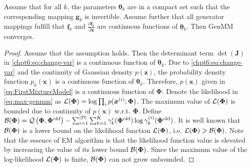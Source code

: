 \begin{proposition}
  Assume that for all $k$, the parameters $\bm{\theta}_k$ are in a compact set such that the corresponding mapping $\bm{g}_k$ is invertible. Assume further that all generator mappings fulfill that $\bm{f}_k$ and $\frac{\partial \bm{f}_k}{\partial \bm{x}}$ are continuous functions of $\bm{\theta}_k$. Then GenMM converges. 
\end{proposition}
\begin{proof}
  Assume that the assumption holds. Then the determinant term $\det(\bm{J})$ in \eqref{chpt6:eq:change-var} is a continuous function of $\bm{\theta}_k$. Due to \eqref{chpt6:eq:change-var} and the continuity of Gaussian density $p(\bm{z})$, the probability density function $p_k(\bm{x})$ is a continuous function of $\bm{\theta}_k$. Therefore, $p(\bm{x})$ given in \eqref{eq:FirstMixtureModel} is a continuous function of $\bm{\Phi}$. Denote the likelihood in \eqref{eq:max-genmm} as $\mathcal{L}(\bm{\Phi})=\log \textstyle\prod_{i} p(\bm{x}^{(i)};\bm{\Phi})$. The maximum value of $\mathcal{L}(\bm{\Phi})$ is bounded due to continuity of $p(\bm{x})$ w.r.t. $\bm{\Phi}$.
  Define $\mathcal{B}(\bm{\Phi}) = \mathcal{Q}\left(\bm{\Phi},\bm{\Phi}^{\mathrm{old}}\right) - \sum_{i=1}^{| \mathcal{D} |}\sum_{k=1}^{K}\gamma_k^{i}(\bm{\Phi}^{\mathrm{old}}) \log\gamma_k^{(i)}(\bm{\Phi}^{\mathrm{old}})$. It is well known that $\mathcal{B}(\bm{\Phi})$ is a lower bound on the likelihood function $\mathcal{L}(\bm{\Phi})$, i.e. $\mathcal{L}(\bm{\Phi}) \geqslant \mathcal{B}(\bm{\Phi})$. Note that the essence of EM algorithm is that the likelihood function value is elevated by increasing the value of its lower bound $\mathcal{B}(\bm{\Phi})$. Since the maximum value of the log-likelihood $\mathcal{L}(\bm{\Phi})$ is finite, $\mathcal{B}(\bm{\Phi})$ can not grow unbounded.

\end{proof}
